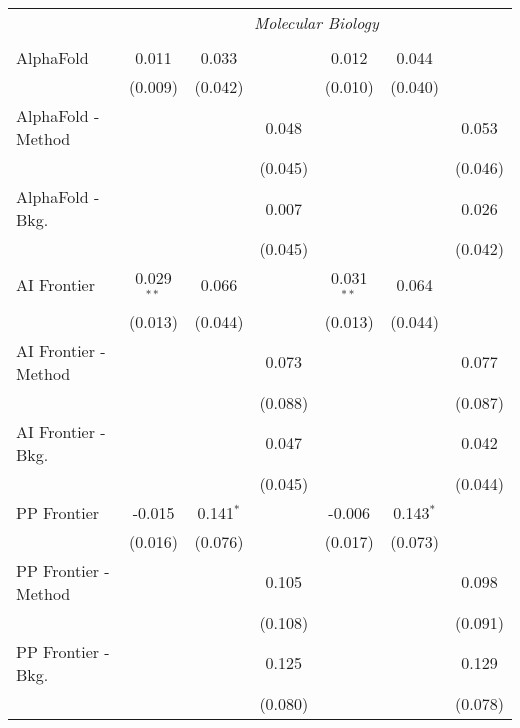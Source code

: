 \begin{tabular}{lcccccc}
 & \multicolumn{6}{c}{\textit{Molecular Biology}} \\ \\
   AlphaFold            & 0.011        & 0.033       &         & 0.012        & 0.044       &   \\   
                        & (0.009)      & (0.042)     &         & (0.010)      & (0.040)     &   \\   
   AlphaFold - Method   &              &             & 0.048   &              &             & 0.053\\   
                        &              &             & (0.045) &              &             & (0.046)\\   
   AlphaFold - Bkg.     &              &             & 0.007   &              &             & 0.026\\   
                        &              &             & (0.045) &              &             & (0.042)\\   
   AI Frontier          & 0.029$^{**}$ & 0.066       &         & 0.031$^{**}$ & 0.064       &   \\   
                        & (0.013)      & (0.044)     &         & (0.013)      & (0.044)     &   \\   
   AI Frontier - Method &              &             & 0.073   &              &             & 0.077\\   
                        &              &             & (0.088) &              &             & (0.087)\\   
   AI Frontier - Bkg.   &              &             & 0.047   &              &             & 0.042\\   
                        &              &             & (0.045) &              &             & (0.044)\\   
   PP Frontier          & -0.015       & 0.141$^{*}$ &         & -0.006       & 0.143$^{*}$ &   \\   
                        & (0.016)      & (0.076)     &         & (0.017)      & (0.073)     &   \\   
   PP Frontier - Method &              &             & 0.105   &              &             & 0.098\\   
                        &              &             & (0.108) &              &             & (0.091)\\   
   PP Frontier - Bkg.   &              &             & 0.125   &              &             & 0.129\\   
                        &              &             & (0.080) &              &             & (0.078)\\   

\end{tabular}

